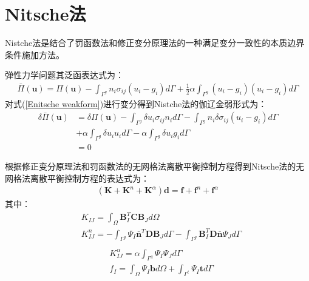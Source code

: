 \section{Nitsche法}
Nistche法\cite{}是结合了罚函数法和修正变分原理法的一种满足变分一致性的本质边界条件施加方法。\par
弹性力学问题其泛函表达式为：
\begin{equation}\label{Enitsche weakform}
\begin{split}
    \bar{\Pi}(\pmb{u})=\Pi(\pmb{u})-\int_{\Gamma^g}n_i\sigma_{ij}(u_i-g_i)d\Gamma+\frac{1}{2}\alpha\int_{\Gamma^g}(u_i-g_i)(u_i-g_i)d\Gamma
\end{split}
\end{equation}
对式(\ref{Enitsche weakform})进行变分得到Nistche法的伽辽金弱形式为：
\begin{equation}
\begin{split}
    \delta\bar{\Pi}(\pmb{u})&=\delta\Pi(\pmb{u})-\int_{\Gamma^g}\delta u_i\sigma_{ij}n_id\Gamma-\int_{\Gamma^g}n_i\delta\sigma_{ij}(u_i-g_i)d\Gamma\\
&+\alpha\int_{\Gamma^g}\delta u_iu_id\Gamma-\alpha\int_{\Gamma^g}\delta u_i g_id\Gamma\\
&=0
\end{split}
\end{equation}\par
根据修正变分原理法和罚函数法的无网格法离散平衡控制方程得到Nitsche法的无网格法离散平衡控制方程的表达式为：
\begin{equation}
\begin{split}
    (\pmb{K}+\pmb{K}^n+\pmb{K}^{\alpha})\pmb{d}=\pmb{f}+\pmb{f}^n+\pmb{f}^{\alpha}
\end{split}
\end{equation}
其中：
\begin{equation}
\begin{split}
   &K_{IJ}=\int_{\Omega}\pmb{B}_I^T\pmb{C}\pmb{B}_Jd\Omega\\
   &K^n_{IJ}=-\int_{\Gamma^g}\Psi_I\bar{\pmb{n}}^T\pmb{D}\pmb{B}_Jd\Gamma-\int_{\Gamma^g}\pmb{B}_I^T\pmb{D}\bar{\pmb{n}}\Psi_Jd\Gamma\\
\end{split}
\end{equation}
\begin{equation}
\begin{split}   
   &K^{\alpha}_{IJ}=\alpha\int_{\Gamma^g}\Psi_I\Psi_Jd\Gamma\\
   &f_I=\int_{\Omega}\Psi_I\pmb{b}d\Omega+\int_{\Gamma^t}\Psi_I\pmb{t}d\Gamma\\
\end{split}
\end{equation}
